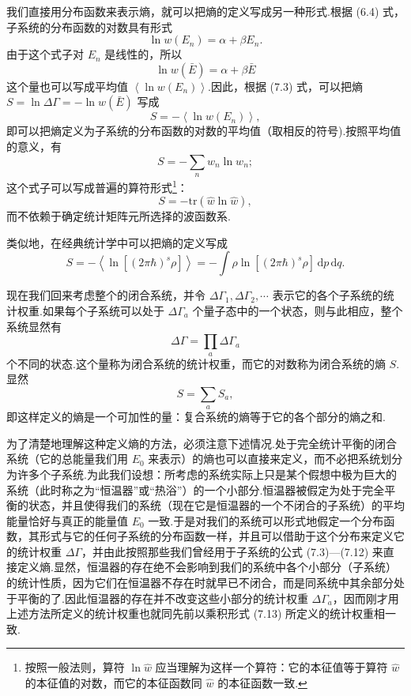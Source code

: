 我们直接用分布函数来表示熵，就可以把熵的定义写成另一种形式.根据 (6.4) 式，子系统的分布函数的对数具有形式
\begin{equation*}
  \ln w(E_n)=\alpha+\beta E_n.
\end{equation*}
由于这个式子对 $E_n$ 是线性的，所以
\begin{equation*}
  \ln w(\bar{E})=\alpha+\beta\bar{E}
\end{equation*}
这个量也可以写成平均值 $\left\langle\ln w(E_n)\right\rangle$.因此，根据 (7.3) 式，可以把熵 $S=\ln\Delta\Gamma=-\ln w(\bar{E})$ 写成
\begin{equation}
  S=-\left\langle\ln w(E_n)\right\rangle,
\end{equation}
即可以把熵定义为子系统的分布函数的对数的平均值（取相反的符号).按照平均值的意义，有
\begin{equation}
  S=-\sum_n w_n\ln w_n;
\end{equation}
这个式子可以写成普遍的算符形式\footnote{按照一般法则，算符 $\ln\hat{w}$ 应当理解为这样一个算符：它的本征值等于算符 $\hat{w}$ 的本征值的对数，而它的本征函数同 $\hat{w}$ 的本征函数一致.}：
\begin{equation}
  S=-\mathrm{tr}\left(\hat{w}\ln\hat{w}\right),
\end{equation}
而不依赖于确定统计矩阵元所选择的波函数系.

类似地，在经典统计学中可以把熵的定义写成
\begin{equation}
  S=-\left\langle\ln[(2\pi\hbar)^s\rho]\right\rangle
  =-\int\rho\ln[(2\pi\hbar)^s\rho]\,\mathrm{d}p\,\mathrm{d}q.
\end{equation}

现在我们回来考虑整个的闭合系统，并令 $\Delta\Gamma_1,\Delta\Gamma_2,\cdots$ 表示它的各个子系统的统计权重.如果每个子系统可以处于 $\Delta\Gamma_a$ 个量子态中的一个状态，则与此相应，整个系统显然有
\begin{equation}
  \Delta\Gamma=\prod_a\Delta\Gamma_a
\end{equation}
个不同的状态.这个量称为闭合系统的统计权重，而它的对数称为闭合系统的熵 $S$. 显然
\begin{equation}
  S=\sum_a S_a,
\end{equation}
即这样定义的熵是一个可加性的量：复合系统的熵等于它的各个部分的熵之和.

为了清楚地理解这种定义熵的方法，必须注意下述情况.处于完全统计平衡的闭合系统（它的总能量我们用 $E_0$ 来表示）的熵也可以直接来定义，而不必把系统划分为许多个子系统.为此我们设想：所考虑的系统实际上只是某个假想中极为巨大的系统（此时称之为“恒温器”或“热浴”）的一个小部分.恒温器被假定为处于完全平衡的状态，并且使得我们的系统（现在它是恒温器的一个不闭合的子系统）的平均能量恰好与真正的能量值 $E_0$ 一致.于是对我们的系统可以形式地假定一个分布函数，其形式与它的任何子系统的分布函数一样，并且可以借助于这个分布来定义它的统计权重 $\Delta\Gamma$，并由此按照那些我们曾经用于子系统的公式 (7.3)—(7.12) 来直接定义熵.显然，恒温器的存在绝不会影响到我们的系统中各个小部分（子系统）的统计性质，因为它们在恒温器不存在时就早已不闭合，而是同系统中其余部分处于平衡的了.因此恒温器的存在并不改变这些小部分的统计权重 $\Delta\Gamma_a$，因而刚才用上述方法所定义的统计权重也就同先前以乘积形式 (7.13) 所定义的统计权重相一致.

